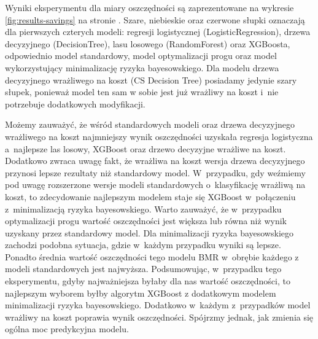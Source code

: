 \documentclass[inzynierska]{pwr_wmat_praca_dyplomowa}
\theoremstyle{plain}
\numberwithin{theorem}{chapter}
\theoremstyle{definition}
\numberwithin{theorem}{chapter}
\begin{document}
Wyniki eksperymentu dla miary oszczędności są zaprezentowane na wykresie \ref{fig:results-savings} na stronie \pageref{fig:results-savings}. Szare, niebieskie oraz czerwone słupki oznaczają dla pierwszych czterych modeli: regresji logistycznej (LogisticRegression), drzewa decyzyjnego (DecisionTree), lasu losowego (RandomForest) oraz XGBoosta, odpowiednio model standardowy, model optymalizacji progu oraz model wykorzystujący minimalizację ryzyka bayesowskiego. Dla modelu drzewa decyzyjnego wrażliwego na koszt (CS Decision Tree) posiadamy jedynie szary słupek, ponieważ model ten sam w sobie jest już wrażliwy na koszt i~nie potrzebuje dodatkowych modyfikacji. 

Możemy zauważyć, że wśród standardowych modeli oraz drzewa decyzyjnego wrażliwego na koszt najmniejszy wynik oszczędności uzyskała regresja logistyczna a~najlepsze las losowy, XGBoost oraz drzewo decyzyjne wrażliwe na koszt. Dodatkowo zwraca uwagę fakt, że wrażliwa na koszt wersja drzewa decyzyjnego przynosi lepsze rezultaty niż standardowy model. W~przypadku, gdy weźmiemy pod uwagę rozszerzone wersje modeli standardowych o~klasyfikację wrażliwą na koszt, to zdecydowanie najlepszym modelem staje się XGBoost w~połączeniu z~minimalizacją ryzyka bayesowskiego. Warto zauważyć, że w~przypadku optymalizacji progu wartość oszczędności jest większa lub równa niż wynik uzyskany przez standardowy model. Dla minimalizacji ryzyka bayesowskiego zachodzi podobna sytuacja, gdzie w~każdym przypadku wyniki są lepsze. Ponadto średnia wartość oszczędności tego modelu BMR w~obrębie każdego z modeli standardowych jest najwyższa. Podsumowując, w~przypadku tego eksperymentu, gdyby najważniejsza byłaby dla nas wartość oszczędności, to najlepszym wyborem byłby algorytm XGBoost z dodatkowym modelem minimalizacji ryzyka bayesowskiego. Dodatkowo w~każdym z~przypadków model wrażliwy na koszt poprawia wynik oszczędności. Spójrzmy jednak, jak zmienia się ogólna moc predykcyjna modelu.
\end{document}
